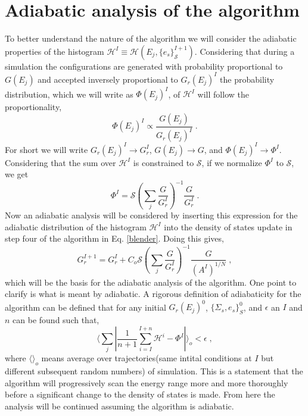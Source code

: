 \documentclass[aps,pre,reprint,superscriptaddress,showkeys]{revtex4-2}
\begin{document}
\section{Adiabatic analysis of the algorithm}
\label{sec3}
To better understand the nature of the algorithm we will consider the adiabatic properties of the histogram $\mathcal{H}^I\equiv \mathcal{H}(E_j, \{e_s\}_\mathcal{S}^{I+1})$. Considering that during a simulation the configurations are generated with probability proportional to $G(E_j)$ and accepted inversely proportional to $G_{r}(E_j)^I$ the probability distribution, which we will write as $\Phi(E_j)^I$, of  $\mathcal{H}^I$ will follow the proportionality,
\begin{equation}
 \Phi(E_j)^I\propto \frac{G(E_j)}{G_r(E_j)^I} \;.
 \end{equation}
  For short we will write $G_r(E_j)^I \rightarrow G_r^I$, $G(E_j)\rightarrow G$, and $\Phi(E_j)^I\rightarrow \Phi^I$.  Considering that the sum over $\mathcal{H}^I$ is constrained to $\mathcal{S}$, if we normalize $\Phi^I$ to $\mathcal{S}$, we get
\begin{equation}
\Phi^I = \mathcal{S}(\sum_{j}\frac{G}{G_r^I})^{-1}\frac{G}{G_r^I} \;.
\label{adiabatic_distribution}
\end{equation}
Now an adiabatic analysis will be considered by inserting this expression for the adiabatic distribution of the histogram $\mathcal{H}^I$ into the density of states update  in step four of the algorithm in Eq. \ref{blender}.  Doing this gives, 
\begin{equation}
G_r^{I+1} = G_r^I  +   C_o\mathcal{S}(\sum_{j}\frac{G}{G_r^I})^{-1}\frac{G}{(A^I)^{1/N}}  \;,
\label{adiabatic_update}
\end{equation}
which will be the basis for the adiabatic analysis of the algorithm. One point to clarify is what is meant by adiabatic. A rigorous definition of adiabaticity for the algorithm can be defined that for any initial $G_r(E_j)^0$, $\{\Sigma_s,e_s\}_S^0$, and $\epsilon$ an  $I$ and $n$ can be found such that, 
\begin{equation}
  \langle \sum_j |\frac{1}{n+1}{\sum_{i=I}^{I+n}\mathcal{H}^i -  \Phi^I}| \rangle_o < \epsilon \;,
\end{equation}
where $\langle \rangle_o$ means average over trajectories(same intital conditions at $I$ but different subsequent random numbers) of simulation. This is a statement that the algorithm will progressively scan the energy range more and more thoroughly before a significant change to the density of states is made.   From here the analysis will be continued assuming the algorithm is adiabatic. 
\end{document}
